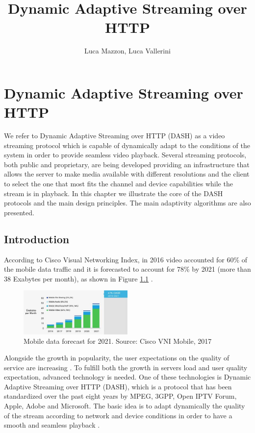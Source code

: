 \documentclass[openany]{book}
\begin{document}
\title{Dynamic Adaptive Streaming over HTTP}
\author{Luca Mazzon, Luca Vallerini}


\chapter{Dynamic Adaptive Streaming over HTTP}
We refer to Dynamic Adaptive Streaming over HTTP (DASH) as a video streaming protocol which is capable of dynamically adapt to the conditions of the system in order to provide seamless video playback. Several streaming protocols, both public and proprietary, are being developed providing an infrastructure that allows the server to make media available with different resolutions and the client to select the one that most fits the channel and device capabilities while the stream is in playback. In this chapter we illustrate the core of the DASH protocols and the main design principles. The main adaptivity algorithms are also presented.
\section{Introduction}\label{sec:intro}
According to Cisco Visual Networking Index, in 2016 video accounted for 60\% of the mobile data traffic and it is forecasted to account for 78\% by 2021 (more than 38 Exabytes per month), as shown in Figure \ref{fig:mobiletraffic} \cite{Cisco}. 
\begin{figure}[ht]
\centering
\includegraphics[width=0.5\textwidth]{mobiletraffic.jpg}
\caption{\label{fig:mobiletraffic}Mobile data forecast for 2021. Source: Cisco VNI Mobile, 2017}
\end{figure}
Alongside the growth in popularity, the user expectations on the quality of service are increasing \cite{DASH2}. To fulfill both the growth in servers load and user quality expectation, advanced technology is needed. One of these technologies is Dynamic Adaptive Streaming over HTTP (DASH), which is a protocol that has been standardized over the past eight years by MPEG, 3GPP, Open IPTV Forum, Apple, Adobe and Microsoft. \cite{HLS, MPEG, TS26.233, MS, wiki} The basic idea is to adapt dynamically the quality of the stream according to network and device conditions in order to have a smooth and seamless playback \cite{DASH1, DASH2, wiki}.
\end{document}
